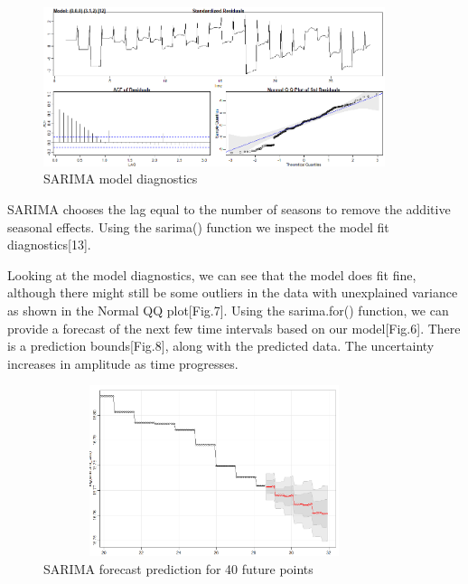 \documentclass[runningheads]{llncs}
\begin{document}
\begin{figure}
\centering
\includegraphics[scale=1,width=10cm]{Sarima.png} 
\caption{SARIMA model diagnostics}
\end{figure}

SARIMA chooses the lag equal to the number of seasons to remove the additive seasonal effects. Using the sarima() function we inspect the model fit diagnostics[13].

Looking at the model diagnostics, we can see that the model does fit fine, although there might still be some outliers in the data with unexplained variance as shown in the Normal QQ plot[Fig.7].
Using the sarima.for() function, we can provide a forecast of the next few time intervals based on our model[Fig.6]. There is a prediction bounds[Fig.8], along with the predicted data. The uncertainty
increases in amplitude as time progresses.





\begin{figure}
\centering
\includegraphics[scale=1,width=10cm,height=5cm]{SarimaPrediction.png} 
\caption{SARIMA forecast prediction for 40 future points}
\end{figure}
\end{document}

